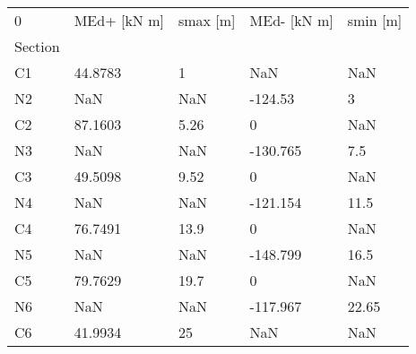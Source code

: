 \begin{tabular}{lllll}
\toprule
0 & MEd+ [kN m] & smax [m] & MEd- [kN m] & smin [m] \\
Section &             &          &             &          \\
\midrule
C1      &     44.8783 &        1 &         NaN &      NaN \\
N2      &         NaN &      NaN &     -124.53 &        3 \\
C2      &     87.1603 &     5.26 &           0 &      NaN \\
N3      &         NaN &      NaN &    -130.765 &      7.5 \\
C3      &     49.5098 &     9.52 &           0 &      NaN \\
N4      &         NaN &      NaN &    -121.154 &     11.5 \\
C4      &     76.7491 &     13.9 &           0 &      NaN \\
N5      &         NaN &      NaN &    -148.799 &     16.5 \\
C5      &     79.7629 &     19.7 &           0 &      NaN \\
N6      &         NaN &      NaN &    -117.967 &    22.65 \\
C6      &     41.9934 &       25 &         NaN &      NaN \\
\bottomrule
\end{tabular}
